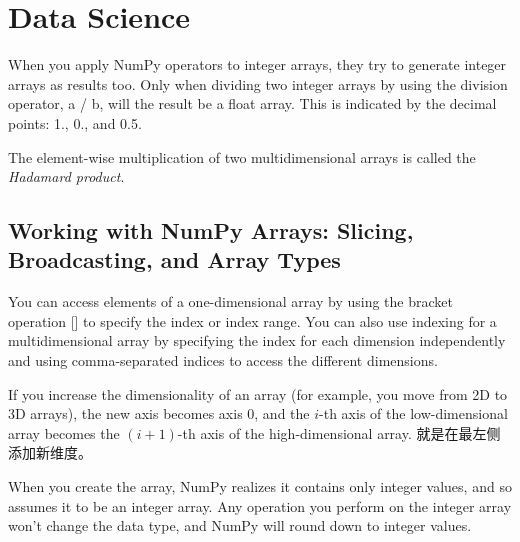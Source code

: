 \chapter{Data Science\label{Ch03}}
When you apply NumPy operators to integer arrays, they try to generate integer arrays as results too. Only when dividing two integer arrays by using the division operator, a / b, will the result be a float array. This is indicated by the decimal points: 1., 0., and 0.5.

The element-wise multiplication of two multidimensional arrays is called the \textit{Hadamard product}.

\section{Working with NumPy Arrays: Slicing, Broadcasting, and Array Types}
You can access elements of a one-dimensional array by using the bracket operation [] to specify the index or index range. You can also use indexing for a multidimensional array by specifying the index for each dimension independently and using comma-separated indices to access the different dimensions.

If you increase the dimensionality of an array (for example, you move from 2D to 3D arrays), the new axis becomes axis 0, and the $i$-th axis of the low-dimensional array becomes the $(i + 1)$-th axis of the high-dimensional array. 就是在最左侧添加新维度。

When you create the array, NumPy realizes it contains only integer values, and so assumes it to be an integer array. Any operation you perform on the integer array won't change the data type, and NumPy will round down to integer values.